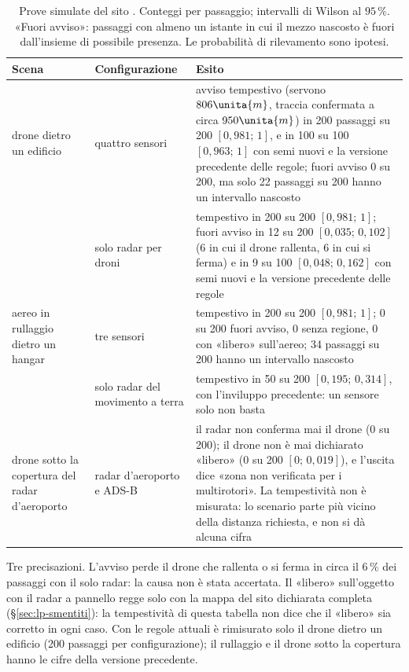 \begin{table}[H]\centering\footnotesize
\caption{Prove simulate del sito . Conteggi per passaggio; intervalli di Wilson al $95\,\%$. «Fuori avviso»: passaggi con almeno un istante in cui il mezzo nascosto è fuori dall'insieme di possibile presenza. Le probabilità di rilevamento sono ipotesi.}\label{tab:lp-prove}
\begin{tabularx}{\linewidth}{@{}>{\RaggedRight\arraybackslash}p{3.0cm}>{\RaggedRight\arraybackslash}p{2.7cm}L@{}}
\toprule
Scena & Configurazione & Esito\\
\midrule
drone dietro un edificio & quattro sensori & avviso tempestivo (servono $806\unita{m}$, traccia confermata a circa $950\unita{m}$) in 200 passaggi su 200 $[0{,}981;\,1]$, e in 100 su 100 $[0{,}963;\,1]$ con semi nuovi e la versione precedente delle regole; fuori avviso 0 su 200, ma solo 22 passaggi su 200 hanno un intervallo nascosto\\
 & solo radar per droni & tempestivo in 200 su 200 $[0{,}981;\,1]$; fuori avviso in 12 su 200 $[0{,}035;\,0{,}102]$ (6 in cui il drone rallenta, 6 in cui si ferma) e in 9 su 100 $[0{,}048;\,0{,}162]$ con semi nuovi e la versione precedente delle regole\\
aereo in rullaggio dietro un hangar & tre sensori & tempestivo in 200 su 200 $[0{,}981;\,1]$; 0 su 200 fuori avviso, 0 senza regione, 0 con «libero» sull'aereo; 34 passaggi su 200 hanno un intervallo nascosto\\
 & solo radar del movimento a terra & tempestivo in 50 su 200 $[0{,}195;\,0{,}314]$, con l'inviluppo precedente: un sensore solo non basta\\
drone sotto la copertura del radar d'aeroporto & radar d'aeroporto e ADS-B & il radar non conferma mai il drone (0 su 200); il drone non è mai dichiarato «libero» (0 su 200 $[0;\,0{,}019]$), e l'uscita dice «zona non verificata per i multirotori». La tempestività non è misurata: lo scenario parte più vicino della distanza richiesta, e non si dà alcuna cifra\\
\bottomrule
\end{tabularx}
\end{table}

Tre precisazioni. L'avviso perde il drone che rallenta o si ferma in circa il $6\,\%$ dei passaggi con il solo radar: la causa non è stata accertata. Il «libero» sull'oggetto con il radar a pannello regge solo con la mappa del sito dichiarata completa (\S\ref{sec:lp-smentiti}): la tempestività di questa tabella non dice che il «libero» sia corretto in ogni caso. Con le regole attuali è rimisurato solo il drone dietro un edificio (200 passaggi per configurazione); il rullaggio e il drone sotto la copertura hanno le cifre della versione precedente.

